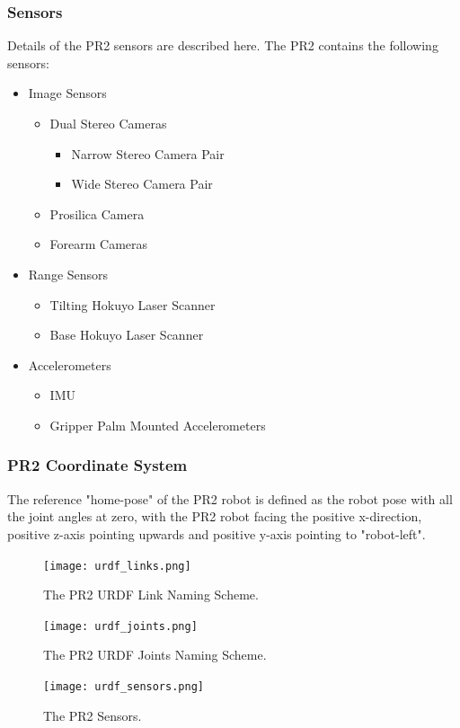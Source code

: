 \subsubsection{Sensors}
\label{subsec:pr2_sensors}
Details of the PR2 sensors are described here.
The PR2 contains the following sensors:
\begin{itemize}
\item Image Sensors
  \begin{itemize}
  \item Dual Stereo Cameras
    \begin{itemize}
    \item Narrow Stereo Camera Pair
    \item Wide Stereo Camera Pair
    \end{itemize}
  \item Prosilica Camera
  \item Forearm Cameras
  \end{itemize}
\item Range Sensors
  \begin{itemize}
  \item Tilting Hokuyo Laser Scanner
  \item Base Hokuyo Laser Scanner
  \end{itemize}
\item Accelerometers
  \begin{itemize}
  \item IMU
  \item Gripper Palm Mounted Accelerometers
  \end{itemize}
\end{itemize}


\subsubsection{PR2 Coordinate System}
The reference "home-pose" of the PR2 robot is defined as the robot pose with all the joint angles at zero,
with the PR2 robot facing the positive x-direction, positive z-axis pointing upwards and positive y-axis pointing to "robot-left".

\begin{figure}[!h]
\centering
\texttt{[image: urdf\_links.png]}
\caption{The PR2 URDF Link Naming Scheme.}
\label{fig:urdf_link_names}
\texttt{[image: urdf\_joints.png]}
\caption{The PR2 URDF Joints Naming Scheme.}
\label{fig:urdf_joints}
\texttt{[image: urdf\_sensors.png]}
\caption{The PR2 Sensors.}
\label{fig:urdf_sensor}
\end{figure}

